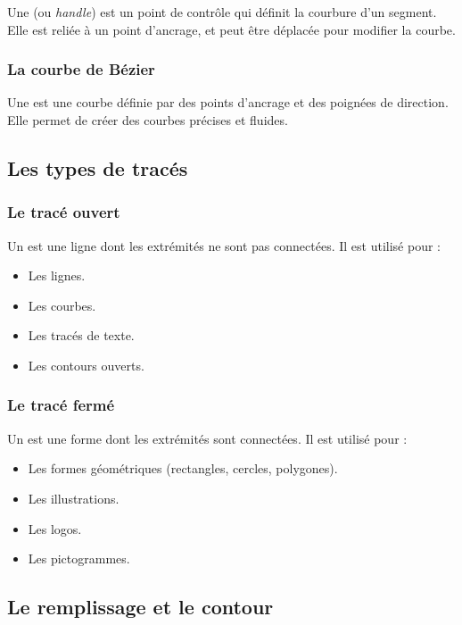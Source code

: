 Une  (ou \emph{handle}) est un point de contrôle qui définit la courbure d'un segment. Elle est reliée à un point d'ancrage, et peut être déplacée pour modifier la courbe.

\subsubsection{La courbe de Bézier}

Une  est une courbe définie par des points d'ancrage et des poignées de direction. Elle permet de créer des courbes précises et fluides.

\subsection{Les types de tracés}

\subsubsection{Le tracé ouvert}

Un  est une ligne dont les extrémités ne sont pas connectées. Il est utilisé pour :

\begin{itemize}
    \item Les lignes.
    \item Les courbes.
    \item Les tracés de texte.
    \item Les contours ouverts.
\end{itemize}

\subsubsection{Le tracé fermé}

Un  est une forme dont les extrémités sont connectées. Il est utilisé pour :

\begin{itemize}
    \item Les formes géométriques (rectangles, cercles, polygones).
    \item Les illustrations.
    \item Les logos.
    \item Les pictogrammes.
\end{itemize}

\subsection{Le remplissage et le contour}

